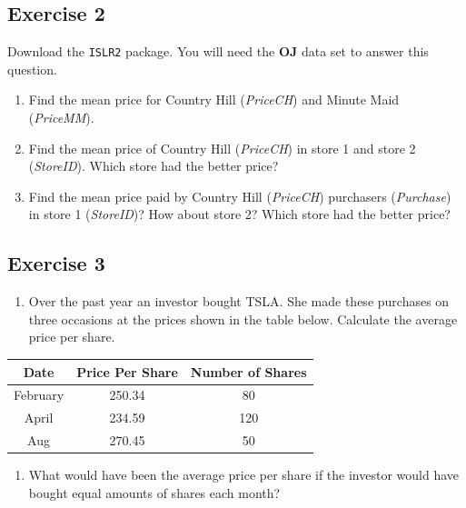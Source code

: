 \documentclass[
  letterpaper,
  DIV=11,
  numbers=noendperiod]{scrreprt}
\providecommand{\tightlist}{%
  \setlength{\itemsep}{0pt}\setlength{\parskip}{0pt}}\usepackage{longtable,booktabs,array}
\begin{document}
\hypertarget{exercise-2-4}{%
\subsection*{Exercise 2}\label{exercise-2-4}}

Download the \texttt{ISLR2} package. You will need the \textbf{OJ} data
set to answer this question.

\begin{enumerate}
\def\labelenumi{\arabic{enumi}.}
\item
  Find the mean price for Country Hill (\emph{PriceCH}) and Minute Maid
  (\emph{PriceMM}).
\item
  Find the mean price of Country Hill (\emph{PriceCH}) in store 1 and
  store 2 (\emph{StoreID}). Which store had the better price?
\item
  Find the mean price paid by Country Hill (\emph{PriceCH}) purchasers
  (\emph{Purchase}) in store 1 (\emph{StoreID})? How about store 2?
  Which store had the better price?
\end{enumerate}

\hypertarget{exercise-3-4}{%
\subsection*{Exercise 3}\label{exercise-3-4}}

\begin{enumerate}
\def\labelenumi{\arabic{enumi}.}
\tightlist
\item
  Over the past year an investor bought TSLA. She made these purchases
  on three occasions at the prices shown in the table below. Calculate
  the average price per share.
\end{enumerate}

\begin{longtable}[]{@{}ccc@{}}
\toprule()
Date & Price Per Share & Number of Shares \\
\midrule()
\endhead
February & 250.34 & 80 \\
April & 234.59 & 120 \\
Aug & 270.45 & 50 \\
\bottomrule()
\end{longtable}

\begin{enumerate}
\def\labelenumi{\arabic{enumi}.}
\setcounter{enumi}{1}
\tightlist
\item
  What would have been the average price per share if the investor would
  have bought equal amounts of shares each month?
\end{enumerate}
\end{document}
